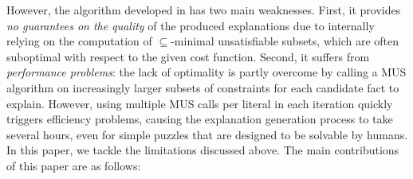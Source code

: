 \documentclass[a4paper,UKenglish,cleveref, autoref, thm-restate, pdfa]{lipics-v2021}
\renewcommand\comment[1]{}
\newcommand{\bart}[1]{{\comment{\color{OliveGreen}Bart: #1}}}
\begin{document}
However, the algorithm developed in \cite{ecai/BogaertsGCG20} has two main weaknesses.
First, it provides \emph{no guarantees on the quality} of the produced explanations due to internally relying on the computation of $\subseteq$-minimal unsatisfiable subsets, which are often suboptimal with respect to the given cost function. 
Second, it suffers from \emph{performance problems}: the lack of optimality is partly overcome by calling a MUS algorithm on increasingly larger subsets of constraints for each candidate fact to explain.
However, using multiple MUS calls per literal in each iteration quickly triggers efficiency problems, causing the explanation generation process to take several hours, even for simple puzzles that are designed to be solvable by humans.
In this paper, we tackle the limitations discussed above. The main contributions of this paper are as follows:
\end{document}
